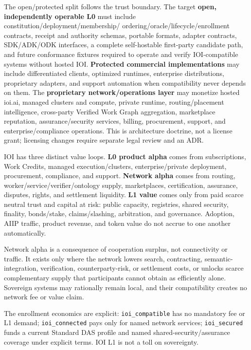 \documentclass[
  11pt,
]{article}
\begin{document}
The open/protected split follows the trust boundary. The target \textbf{open,
independently operable L0} must include constitution/deployment/membership/
ordering/oracle/lifecycle/enrollment contracts, receipt and authority schemas,
portable formats, adapter contracts, SDK/ADK/ODK interfaces, a complete
self-hostable first-party candidate path, and future conformance fixtures
required to operate and verify IOI-compatible systems without hosted IOI.
\textbf{Protected commercial
implementations} may include differentiated clients, optimized runtimes,
enterprise distributions, proprietary adapters, and support automation when
compatibility never depends on them. The \textbf{proprietary
network/operations layer} may monetize hosted ioi.ai, managed clusters and
compute, private runtime, routing/placement intelligence, cross-party Verified
Work Graph aggregation, marketplace reputation, assurance/security services,
billing, procurement, support, and enterprise/compliance operations. This is
architecture doctrine, not a license grant; licensing changes require separate
legal review and an ADR.

IOI has three distinct value loops. \textbf{L0 product alpha} comes from
subscriptions, Work Credits, managed execution/clusters, enterprise/private
deployment, procurement, compliance, and support. \textbf{Network alpha} comes
from routing, worker/service/verifier/ontology supply, marketplaces,
certification, assurance, disputes, rights, and settlement liquidity.
\textbf{L1 value} comes only from paid scarce neutral trust and capital at risk:
public capacity, registries, shared security, finality, bonds/stake,
claims/slashing, arbitration, and governance. Adoption, AIIP traffic, product
revenue, and token value do not accrue to one another automatically.

Network alpha is a consequence of cooperation surplus, not connectivity or
traffic. It exists only where the network lowers search, contracting, semantic-
integration, verification, counterparty-risk, or settlement costs, or unlocks
scarce complementary supply that participants cannot obtain as efficiently
alone. Sovereign systems may rationally remain local, and their compatibility
creates no network fee or value claim.

The enrollment economics are explicit: \texttt{ioi\_compatible} has no
mandatory fee or L1 demand; \texttt{ioi\_connected} pays only for named network
services; \texttt{ioi\_secured} funds a current Standard DAS profile and named
shared-security/assurance coverage under explicit terms. IOI L1 is not a toll
on sovereignty.
\end{document}
